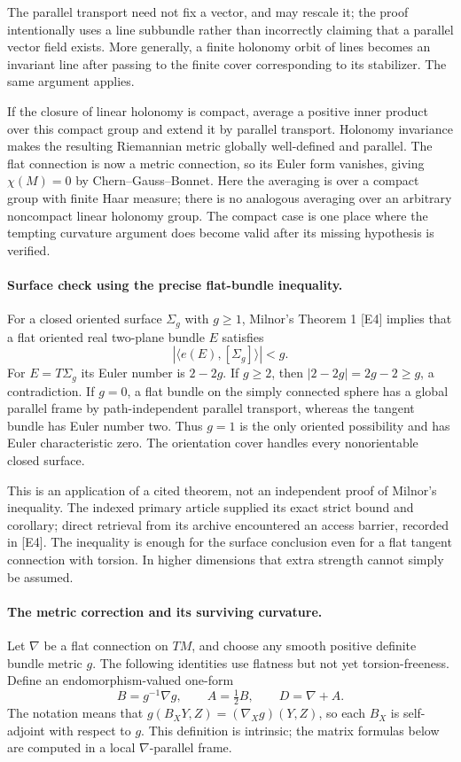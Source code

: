 \documentclass[11pt]{article}
\begin{document}
The parallel transport need not fix a vector, and may rescale it; the
proof intentionally uses a line subbundle rather than incorrectly claiming
that a parallel vector field exists. More generally, a finite holonomy
orbit of lines becomes an invariant line after passing to the finite cover
corresponding to its stabilizer. The same argument applies.

If the closure of linear holonomy is compact, average a positive inner
product over this compact group and extend it by parallel transport.
Holonomy invariance makes the resulting Riemannian metric globally
well-defined and parallel. The flat connection is now a metric connection,
so its Euler form vanishes, giving $\chi(M)=0$ by Chern--Gauss--Bonnet.
Here the averaging is over a compact group with finite Haar measure; there
is no analogous averaging over an arbitrary noncompact linear holonomy
group. The compact case is one place where the tempting curvature argument
does become valid after its missing hypothesis is verified.

\paragraph{Surface check using the precise flat-bundle inequality.}
For a closed oriented surface $\Sigma_g$ with $g\ge1$, Milnor's Theorem 1
[E4] implies that a flat oriented real two-plane bundle $E$ satisfies
\[
 |\langle e(E),[\Sigma_g]\rangle|<g.
\]
For $E=T\Sigma_g$ its Euler number is $2-2g$. If $g\ge2$, then
$|2-2g|=2g-2\ge g$, a contradiction. If $g=0$, a flat bundle on the simply
connected sphere has a global parallel frame by path-independent parallel
transport, whereas the tangent bundle has Euler number two. Thus $g=1$
is the only oriented possibility and has Euler characteristic zero. The
orientation cover handles every nonorientable closed surface.

This is an application of a cited theorem, not an independent proof of
Milnor's inequality. The indexed primary article supplied its exact strict
bound and corollary; direct retrieval from its archive encountered an access
barrier, recorded in [E4]. The inequality is enough for the surface
conclusion even for a flat tangent connection with torsion. In higher
dimensions that extra strength cannot simply be assumed.

\paragraph{The metric correction and its surviving curvature.}
Let $\nabla$ be a flat connection on $TM$, and choose any smooth positive
definite bundle metric $g$. The following identities use flatness but not
yet torsion-freeness. Define an endomorphism-valued one-form
\[
 B=g^{-1}\nabla g,\qquad A=\tfrac12 B,
 \qquad D=\nabla+A.
\]
The notation means that
$g(B_XY,Z)=(\nabla_Xg)(Y,Z)$, so each $B_X$ is self-adjoint with respect
to $g$. This definition is intrinsic; the matrix formulas below are
computed in a local $\nabla$-parallel frame.
\end{document}
